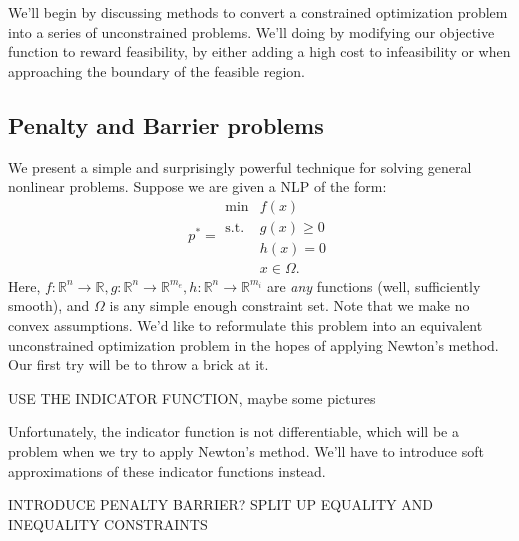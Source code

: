 \documentclass[11pt]{article}
\numberwithin{equation}{section}
\theoremstyle{definition}
\newcommand{\bR}{\mathbb{R}}
\newcommand{\tst}{\text{s.t.}}
\begin{document}
We'll begin by discussing methods to convert a constrained optimization problem into a series of unconstrained problems. We'll doing by modifying our objective function to reward feasibility, by either adding a high cost to infeasibility or when approaching the boundary of the feasible region.
\subsection{Penalty and Barrier problems}
We present a simple and surprisingly powerful technique for solving general nonlinear problems. Suppose we are given a NLP of the form:
\begin{equation}
    \label{eqpbnlp}
    p^*=\begin{array}{cc}
         \min & f(x)  \\
         \tst & g(x)\ge 0\\
              & h(x)=0\\
              & x\in\Omega.
    \end{array}
\end{equation}
Here, $f:\bR^n\to\bR, g:\bR^n\to\bR^{m_e}, h:\bR^n\to\bR^{m_i}$ are \textit{any} functions (well, sufficiently smooth), and $\Omega$ is any simple enough constraint set. Note that we make no convex assumptions. We'd like to reformulate this problem into an equivalent unconstrained optimization problem in the hopes of applying Newton's method. Our first try will be to throw a brick at it.

USE THE INDICATOR FUNCTION, maybe some pictures

Unfortunately, the indicator function is not differentiable, which will be a problem when we try to apply Newton's method. We'll have to introduce soft approximations of these indicator functions instead.

INTRODUCE PENALTY BARRIER? SPLIT UP EQUALITY AND INEQUALITY CONSTRAINTS
\end{document}
